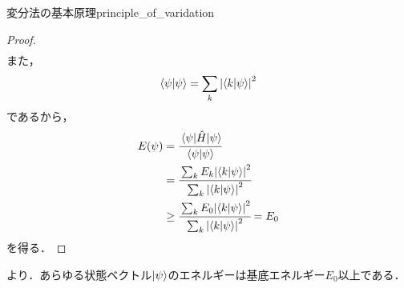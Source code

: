 \documentclass{report}
\begin{document}
\begin{myprop}{変分法の基本原理}{principle_of_varidation}
\begin{proof}
\begin{align}
      \end{align}
      また，
      \begin{align}
        \braket{\psi}{\psi}=\sum_{k}\abs{\braket{k}{\psi}}^2
      \end{align}
      であるから，
      \begin{align}
        E(\psi) &= \cfrac{\mel{\psi}{\hat{H}}{\psi}}{\braket{\psi}{\psi} } \\ 
        &= \cfrac{\sum_{k}E_k\abs{\braket{k}{\psi}}^2}{\sum_{k}\abs{\braket{k}{\psi}}^2} \\ 
        &\geq \cfrac{\sum_{k}E_0\abs{\braket{k}{\psi}}^2}{\sum_{k}\abs{\braket{k}{\psi}}^2} = E_0
      \end{align}
      を得る．
    \end{proof}
  \end{myprop}
  より．あらゆる状態ベクトル$\ket{\psi}$のエネルギーは基底エネルギー$E_0$以上である．
\end{document}
